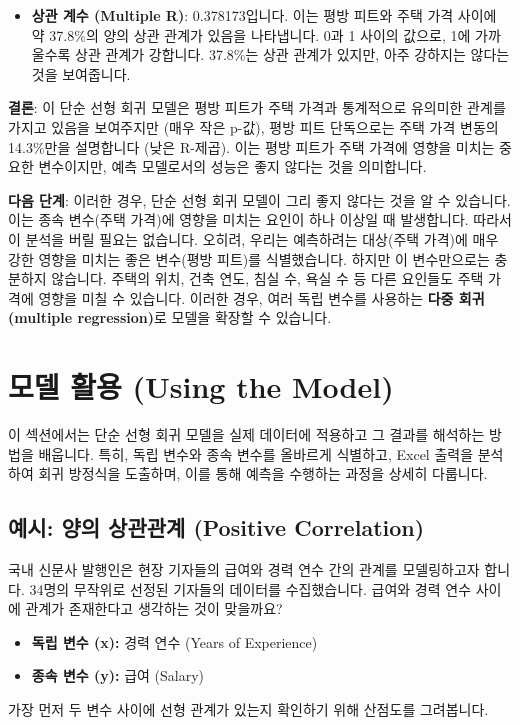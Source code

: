 \documentclass[11pt,a4paper]{book}
\theoremstyle{definition}
\begin{document}
\begin{tcolorbox}[examplebox, title={Excel 실습: Zillow 주택 데이터}]
\begin{itemize}
    \item \textbf{상관 계수 (Multiple R)}: 0.378173입니다. 이는 평방 피트와 주택 가격 사이에 약 37.8\%의 양의 상관 관계가 있음을 나타냅니다. 0과 1 사이의 값으로, 1에 가까울수록 상관 관계가 강합니다. 37.8\%는 상관 관계가 있지만, 아주 강하지는 않다는 것을 보여줍니다.
\end{itemize}

\textbf{결론}:
이 단순 선형 회귀 모델은 평방 피트가 주택 가격과 통계적으로 유의미한 관계를 가지고 있음을 보여주지만 (매우 작은 p-값), 평방 피트 단독으로는 주택 가격 변동의 14.3\%만을 설명합니다 (낮은 R-제곱). 이는 평방 피트가 주택 가격에 영향을 미치는 중요한 변수이지만, 예측 모델로서의 성능은 좋지 않다는 것을 의미합니다.

\textbf{다음 단계}:
이러한 경우, 단순 선형 회귀 모델이 그리 좋지 않다는 것을 알 수 있습니다. 이는 종속 변수(주택 가격)에 영향을 미치는 요인이 하나 이상일 때 발생합니다. 따라서 이 분석을 버릴 필요는 없습니다. 오히려, 우리는 예측하려는 대상(주택 가격)에 매우 강한 영향을 미치는 좋은 변수(평방 피트)를 식별했습니다. 하지만 이 변수만으로는 충분하지 않습니다. 주택의 위치, 건축 연도, 침실 수, 욕실 수 등 다른 요인들도 주택 가격에 영향을 미칠 수 있습니다. 이러한 경우, 여러 독립 변수를 사용하는 \textbf{다중 회귀(multiple regression)}로 모델을 확장할 수 있습니다.
\end{tcolorbox}


\section{모델 활용 (Using the Model)}
이 섹션에서는 단순 선형 회귀 모델을 실제 데이터에 적용하고 그 결과를 해석하는 방법을 배웁니다. 특히, 독립 변수와 종속 변수를 올바르게 식별하고, Excel 출력을 분석하여 회귀 방정식을 도출하며, 이를 통해 예측을 수행하는 과정을 상세히 다룹니다.

\subsection{예시: 양의 상관관계 (Positive Correlation)}
국내 신문사 발행인은 현장 기자들의 급여와 경력 연수 간의 관계를 모델링하고자 합니다. 34명의 무작위로 선정된 기자들의 데이터를 수집했습니다. 급여와 경력 연수 사이에 관계가 존재한다고 생각하는 것이 맞을까요?

\begin{itemize}
    \item \textbf{독립 변수 (x):} 경력 연수 (Years of Experience)
    \item \textbf{종속 변수 (y):} 급여 (Salary)
\end{itemize}
가장 먼저 두 변수 사이에 선형 관계가 있는지 확인하기 위해 산점도를 그려봅니다.
\end{document}
